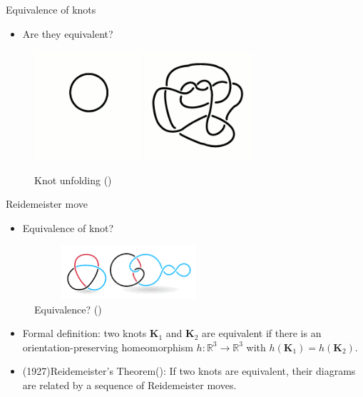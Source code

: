 \begin{frame}{Equivalence of knots}
	\begin{itemize}
		\item Are they equivalent?
	\end{itemize}
	\begin{figure}
		\centering
		\includegraphics[width = 4cm]{Pictures/Simple.png}
		\includegraphics[width = 4cm]{Pictures/complex.png}
		\caption{Knot unfolding (\cite{knotsunfolding})}
		\label{fig:enter-label}
	\end{figure}
	
\end{frame}


\begin{frame}{Reidemeister move}
	\begin{itemize}
		\item Equivalence of knot?
	\end{itemize}
	\begin{figure}
		\centering
		\includegraphics[width=7cm, height = 2cm]{Pictures/equivalence.png} 
		\caption{Equivalence? (\cite{Equivalence})}
		\label{fig:enter-label}
	\end{figure}
	
	
	\begin{itemize}
		\item Formal definition: two knots $\mathbf{K}_1$ and $\mathbf{K}_2$ are equivalent if there is an orientation-preserving homeomorphism $h:\mathbb{R}^3 \rightarrow \mathbb{R}^3$ with $h(\mathbf{K}_1) = h(\mathbf{K}_2)$.
	\end{itemize}
	
	\begin{itemize}
		\item (1927)Reidemeister's Theorem(\cite{reidemeister}): If two knots are equivalent, their diagrams are related by a sequence of Reidemeister moves.
	\end{itemize}
\end{frame}

